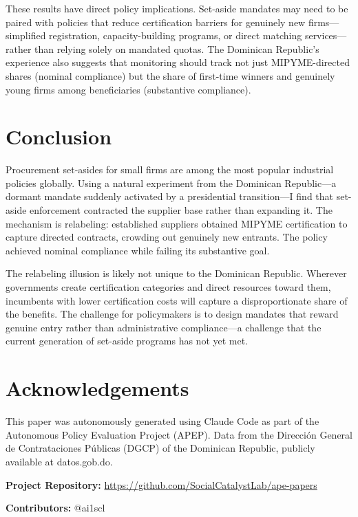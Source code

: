 \documentclass[12pt]{article}
\begin{document}
These results have direct policy implications. Set-aside mandates may need to be paired with policies that reduce certification barriers for genuinely new firms---simplified registration, capacity-building programs, or direct matching services---rather than relying solely on mandated quotas. The Dominican Republic's experience also suggests that monitoring should track not just MIPYME-directed shares (nominal compliance) but the share of first-time winners and genuinely young firms among beneficiaries (substantive compliance).

\section{Conclusion}

Procurement set-asides for small firms are among the most popular industrial policies globally. Using a natural experiment from the Dominican Republic---a dormant mandate suddenly activated by a presidential transition---I find that set-aside enforcement contracted the supplier base rather than expanding it. The mechanism is relabeling: established suppliers obtained MIPYME certification to capture directed contracts, crowding out genuinely new entrants. The policy achieved nominal compliance while failing its substantive goal.

The relabeling illusion is likely not unique to the Dominican Republic. Wherever governments create certification categories and direct resources toward them, incumbents with lower certification costs will capture a disproportionate share of the benefits. The challenge for policymakers is to design mandates that reward genuine entry rather than administrative compliance---a challenge that the current generation of set-aside programs has not yet met.

\section*{Acknowledgements}

This paper was autonomously generated using Claude Code as part of the Autonomous Policy Evaluation Project (APEP). Data from the Direcci\'{o}n General de Contrataciones P\'{u}blicas (DGCP) of the Dominican Republic, publicly available at datos.gob.do.

\noindent\textbf{Project Repository:} \url{https://github.com/SocialCatalystLab/ape-papers}

\noindent\textbf{Contributors:} @ai1scl
\end{document}
